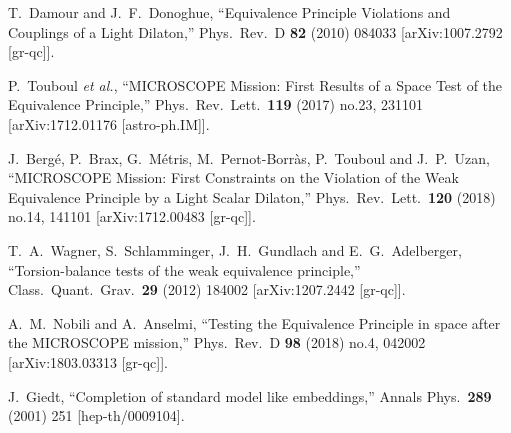 \documentclass[11pt,a4paper]{article}
\begin{document}
\begin{thebibliography}{99}
  T.~Damour and J.~F.~Donoghue,
  ``Equivalence Principle Violations and Couplings of a Light Dilaton,''
  Phys.\ Rev.\ D {\bf 82} (2010) 084033
  [arXiv:1007.2792 [gr-qc]].





  P.~Touboul {\it et al.},
  ``MICROSCOPE Mission: First Results of a Space Test of the Equivalence Principle,''
  Phys.\ Rev.\ Lett.\  {\bf 119} (2017) no.23,  231101
  [arXiv:1712.01176 [astro-ph.IM]].


  J.~Bergé, P.~Brax, G.~Métris, M.~Pernot-Borràs, P.~Touboul and J.~P.~Uzan,
  ``MICROSCOPE Mission: First Constraints on the Violation of the Weak Equivalence Principle by a Light Scalar Dilaton,''
  Phys.\ Rev.\ Lett.\  {\bf 120} (2018) no.14,  141101
  [arXiv:1712.00483 [gr-qc]].


  T.~A.~Wagner, S.~Schlamminger, J.~H.~Gundlach and E.~G.~Adelberger,
  ``Torsion-balance tests of the weak equivalence principle,''
  Class.\ Quant.\ Grav.\  {\bf 29} (2012) 184002
  [arXiv:1207.2442 [gr-qc]].


  A.~M.~Nobili and A.~Anselmi,
  ``Testing the Equivalence Principle in space after the MICROSCOPE mission,''
  Phys.\ Rev.\ D {\bf 98} (2018) no.4,  042002
  [arXiv:1803.03313 [gr-qc]].




  
 
  J.~Giedt,
  ``Completion of standard model like embeddings,''
  Annals Phys.\  {\bf 289} (2001) 251
  [hep-th/0009104].



\end{thebibliography}
\end{document}
